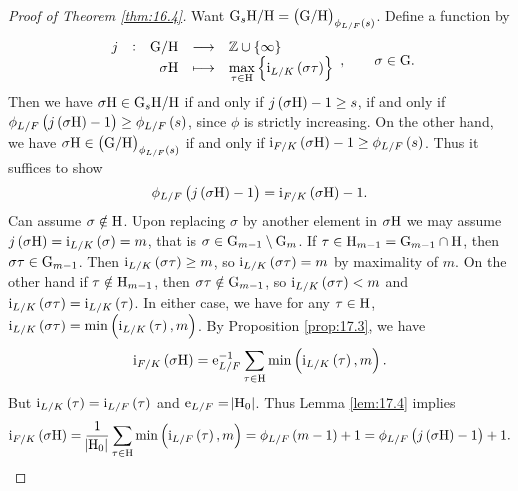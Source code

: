 \pagebreak

\begin{proof}[Proof of Theorem \ref{thm:16.4}]
Want $ \G_s\H / \H = \br{\G / \H}_{\phi_{L / F}\br{s}} $. Define a function by
$$ \function[j]{\G / \H}{\ZZ \cup \cbr{\infty}}{\sigma\H}{\max_{\tau \in \H} \cbr{\i_{L / K}\br{\sigma\tau}}}, \qquad \sigma \in \G. $$
Then we have $ \sigma\mathrm{H} \in \mathrm{G}_s\mathrm{H} / \mathrm{H} $ if and only if $ j\br{\sigma\H} - 1 \ge s $, if and only if $ \phi_{L / F}\br{j\br{\sigma\H} - 1} \ge \phi_{L / F}\br{s} $, since $ \phi $ is strictly increasing. On the other hand, we have $ \sigma\H \in \br{\G / \H}_{\phi_{L / F}\br{s}} $ if and only if $ \i_{F / K}\br{\sigma\H} - 1 \ge \phi_{L / F}\br{s} $. Thus it suffices to show
$$ \phi_{L / F}\br{j\br{\sigma\H} - 1} = \i_{F / K}\br{\sigma\H} - 1. $$
Can assume $ \sigma \notin \mathrm{H} $. Upon replacing $ \sigma $ by another element in $ \sigma\mathrm{H} $ we may assume $ j\br{\sigma\H} = \i_{L / K}\br{\sigma} = m $, that is $ \sigma \in \mathrm{G}_{m - 1} \setminus \mathrm{G}_m $. If $ \tau \in \mathrm{H}_{m - 1} = \mathrm{G}_{m - 1} \cap \mathrm{H} $, then $ \sigma\tau \in \mathrm{G}_{m - 1} $. Then $ \i_{L / K}\br{\sigma\tau} \ge m $, so $ \i_{L / K}\br{\sigma\tau} = m $ by maximality of $ m $. On the other hand if $ \tau \notin \mathrm{H}_{m - 1} $, then $ \sigma\tau \notin \mathrm{G}_{m - 1} $, so $ \i_{L / K}\br{\sigma\tau} < m $ and $ \i_{L / K}\br{\sigma\tau} = \i_{L / K}\br{\tau} $. In either case, we have for any $ \tau \in \mathrm{H} $, $ \i_{L / K}\br{\sigma\tau} = \min\br{\i_{L / K}\br{\tau}, m} $. By Proposition \ref{prop:17.3}, we have
$$ \i_{F / K}\br{\sigma\H} = \e_{L / F}^{-1}\sum_{\tau \in \H} \min\br{\i_{L / K}\br{\tau}, m}. $$
But $ \i_{L / K}\br{\tau} = \i_{L / F}\br{\tau} $ and $ \mathrm{e}_{L / F} = \abs{\mathrm{H}_0} $. Thus Lemma \ref{lem:17.4} implies
$$ \i_{F / K}\br{\sigma\H} = \dfrac{1}{\abs{\H_0}}\sum_{\tau \in \H} \min\br{\i_{L / F}\br{\tau}, m} = \phi_{L / F}\br{m - 1} + 1 = \phi_{L / F}\br{j\br{\sigma\H} - 1} + 1. $$
\end{proof}

